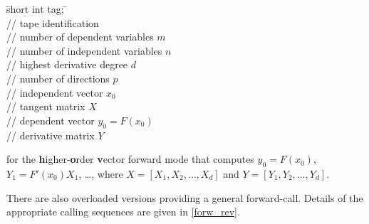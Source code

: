 \documentclass[11pt,twoside]{article}
\begin{document}
\begin{tabbing}
\hspace{0.5in}\={\sf short int tag;} \hspace{1.1in}\= \kill    %
\\
         \> // tape identification \\
                 \> // number of  dependent variables $m$\\
                 \> // number of independent variables $n$\\
                 \> // highest derivative degree $d$\\
                 \> // number of directions $p$\\
          \> // independent vector $x_0$\\
     \> // tangent matrix $X$\\
          \> // dependent vector $y_0=F(x_0)$\\
     \> // derivative matrix $Y$
\end{tabbing}
for the  {\bf h}igher-{\bf o}rder {\bf v}ector forward mode that computes
$y_0=F(x_0)$, $Y_1=F'(x_0)X_1$, \ldots, where $X=[X_1,X_2,\ldots,X_d]$ and  
$Y=[Y_1,Y_2,\ldots,Y_d]$. 

There are also overloaded versions providing a general {\sf forward}-call.
Details of the appropriate calling sequences are given in \autoref{forw_rev}.
\end{document}
